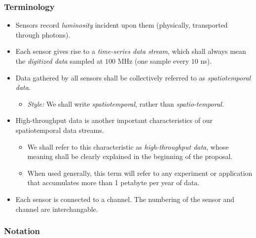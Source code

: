 \documentclass[]{article}
\providecommand{\tightlist}{%
  \setlength{\itemsep}{0pt}\setlength{\parskip}{0pt}}
\begin{document}
\subsubsection{Terminology}

\begin{itemize}
\tightlist
\item
  Sensors record \emph{luminosity} incident upon them (physically, transported through photons).
\item
  Each sensor gives rise to a \emph{time-series data stream}, which shall always mean the \emph{digitized data} sampled at \(100\) MHz (one sample every \(10\) ns).
\item
  Data gathered by all sensors shall be collectively referred to as \emph{spatiotemporal data}.

  \begin{itemize}
  \tightlist
  \item
    \emph{Style:} We shall write \emph{spatiotemporal}, rather than \emph{spatio-temporal}.
  \end{itemize}
\item
  High-throughput data is another important characteristics of our spatiotemporal data streams.

  \begin{itemize}
  \tightlist
  \item
    We shall refer to this characteristic as \emph{high-throughput data}, whose meaning shall be clearly explained in the beginning of the proposal.
  \item
    When used generally, this term will refer to any experiment or application that accumulates more than 1 petabyte per year of data.
  \end{itemize}
  \item Each sensor is connected to a channel.  The numbering of the sensor and channel are interchangable.
\end{itemize}

\subsubsection{Notation}
\end{document}
